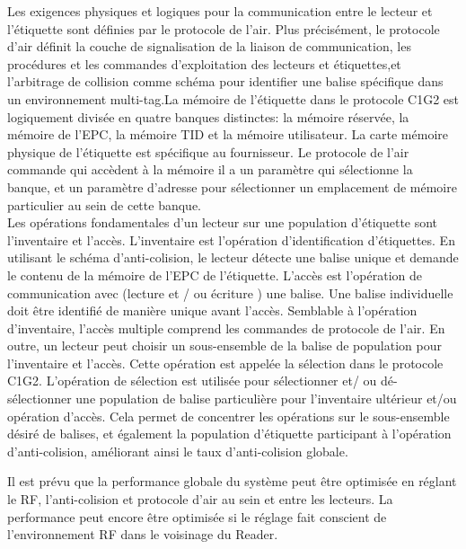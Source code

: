 \documentclass[11pt, a4paper, twoside]{book}
\begin{document}
Les exigences physiques et logiques pour la communication entre le lecteur et l'étiquette  sont définies par le protocole de l'air. Plus précisément, le protocole d'air définit la couche de signalisation de la liaison de communication, les procédures et les commandes d'exploitation des lecteurs et étiquettes,et l'arbitrage de collision comme schéma pour identifier une balise spécifique  dans un environnement multi-tag.La mémoire de l'étiquette dans le protocole C1G2 est logiquement  divisée en quatre banques distinctes: la mémoire réservée, la mémoire de l'EPC, la mémoire TID et la mémoire utilisateur. La carte mémoire physique de l'étiquette est spécifique au fournisseur. Le protocole de l'air commande qui accèdent à la mémoire il a un paramètre qui sélectionne la banque, et un paramètre d'adresse pour sélectionner un emplacement de mémoire particulier au sein de cette banque.\\


Les opérations fondamentales d'un lecteur sur une population d'étiquette sont l'inventaire et l'accès. L'inventaire est l'opération  d'identification d'étiquettes. En utilisant le schéma d'anti-colision, le lecteur détecte une balise unique et demande le contenu de la mémoire de l'EPC de l'étiquette. L'accès est l'opération de  communication avec (lecture et / ou écriture ) une balise. Une balise individuelle doit être identifié de manière unique avant l'accès. Semblable à l'opération d'inventaire, l'accès multiple comprend les commandes de protocole de l'air. En outre, un lecteur peut choisir un sous-ensemble de la balise de population pour l'inventaire et l'accès. Cette opération est appelée la sélection dans le protocole C1G2. L'opération de sélection est utilisée pour sélectionner et/ ou dé-sélectionner une population de balise particulière pour l'inventaire ultérieur et/ou opération d'accès. Cela permet de concentrer les opérations sur le sous-ensemble désiré de balises, et également la population d'étiquette participant à l'opération  d'anti-colision, améliorant ainsi le taux d'anti-colision globale.

Il est prévu que la performance globale du système peut être optimisée en réglant le RF, l'anti-colision et protocole d'air  au sein et entre les lecteurs. La performance peut encore être optimisée si le réglage fait conscient de l'environnement RF dans le voisinage du Reader.\\
\end{document}
